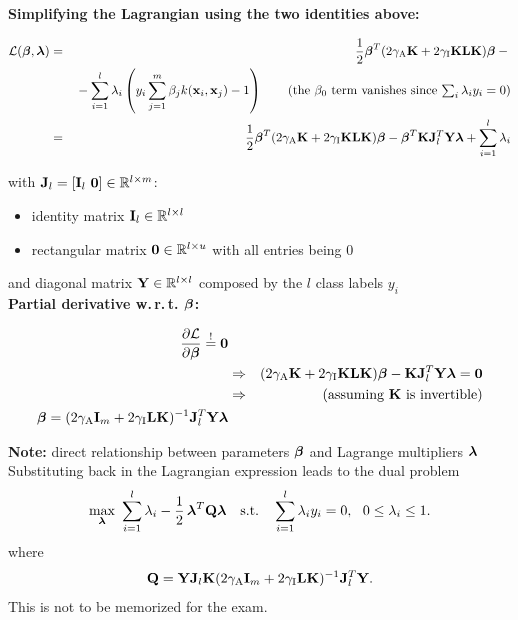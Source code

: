     \textbf{Simplifying the Lagrangian using the two identities above:}
  
  {\small
    \begin{eqnarray*}
      \mathcal L(\bm{\mathrm{\beta}}, \bm{\mathrm{\lambda}}) 
      &=& \frac{1}{2} \bm{\mathrm{\beta}}^T (2 \gamma_\text{A} \mathbf{K} + 2 \gamma_\text{I} \mathbf{K}\mathbf{L}\mathbf{K}) \bm{\mathrm{\beta}} -{} \\
      & & {}- \sum_{i=1}^l \lambda_i \left(y_i \sum_{j=1}^m \beta_j k(\bm{\mathrm{x}}_i,\bm{\mathrm{x}}_j) - 1 \right) \qquad\text{(the $\beta_0$ term vanishes since $\textstyle\sum_i\lambda_iy_i=0$)} \\
      &=& \frac{1}{2} \bm{\mathrm{\beta}}^T (2 \gamma_\text{A} \mathbf{K} + 2 \gamma_\text{I} \mathbf{K}\mathbf{L}\mathbf{K}) \bm{\mathrm{\beta}} -
          \bm{\mathrm{\beta}}^T \mathbf{K} \mathbf{J}_l^T \mathbf{Y} \bm{\mathrm{\lambda}} +
          \sum_{i=1}^l \lambda_i
    \end{eqnarray*}
  }
  
  with $\mathbf{J}_l = [\mathbf{I}_l~\mathbf{0}] \in \mathbb{R}^{l\times m}$:
  \begin{itemize}
    \item identity matrix $\mathbf{I}_l \in \mathbb{R}^{l \times l}$
    \item rectangular matrix $\mathbf{0} \in \mathbb{R}^{l \times u}$ with all entries being 0
  \end{itemize}
  and diagonal matrix $\mathbf{Y} \in \mathbb{R}^{l \times l}$ composed by the $l$ class labels $y_i$\\
\textbf{Partial derivative w.\,r.\,t. $\bm{\mathrm{\beta}}$:}
  
  \begin{eqnarray*}
    \frac{\partial \mathcal L}{\partial \bm{\mathrm{\beta}}} \stackrel{!}{=} \bm{\mathrm{0}} \\
    &\Rightarrow& 
    (2 \gamma_\text{A} \mathbf{K} + 2 \gamma_\text{I} \mathbf{K}\mathbf{L}\mathbf{K}) \bm{\mathrm{\beta}} -
    \mathbf{K} \mathbf{J}_l^T \mathbf{Y} \bm{\mathrm{\lambda}} = \bm{\mathrm{0}}   \\
    &\Rightarrow& \text{(assuming $\mathbf{K}$ is invertible)} \\
    \bm{\mathrm{\beta}} = (2 \gamma_\text{A} \mathbf{I}_m + 2 \gamma_\text{I} \mathbf{L}\mathbf{K})^{-1} 
    \mathbf{J}_l^T \mathbf{Y} \bm{\mathrm{\lambda}}
  \end{eqnarray*}
   
    \textbf{Note:} direct relationship between parameters $\bm{\mathrm{\beta}}$ and Lagrange multipliers $\bm{\mathrm{\lambda}}$\\
   Substituting back in the Lagrangian expression leads to the dual problem
  \begin{displaymath}
    \max_{\vect\lambda}\ \sum_{i=1}^{l}\lambda_i - \frac{1}{2}\,\vect\lambda^T\mat Q\vect\lambda
    \quad\text{s.t.}\quad \sum_{i=1}^{l}\lambda_i y_i = 0,\ \ 0\le \lambda_i \le 1.
  \end{displaymath}
   where
  {\small
  \begin{displaymath}
    \mathbf{Q} = \mathbf{Y} \mathbf{J}_l \mathbf{K}
    (2 \gamma_\text{A} \mathbf{I}_m + 2 \gamma_\text{I} \mathbf{L}\mathbf{K})^{-1}
    \mathbf{J}_l^T \mathbf{Y}.
  \end{displaymath}
  }
 This is not to be memorized for the exam. 

